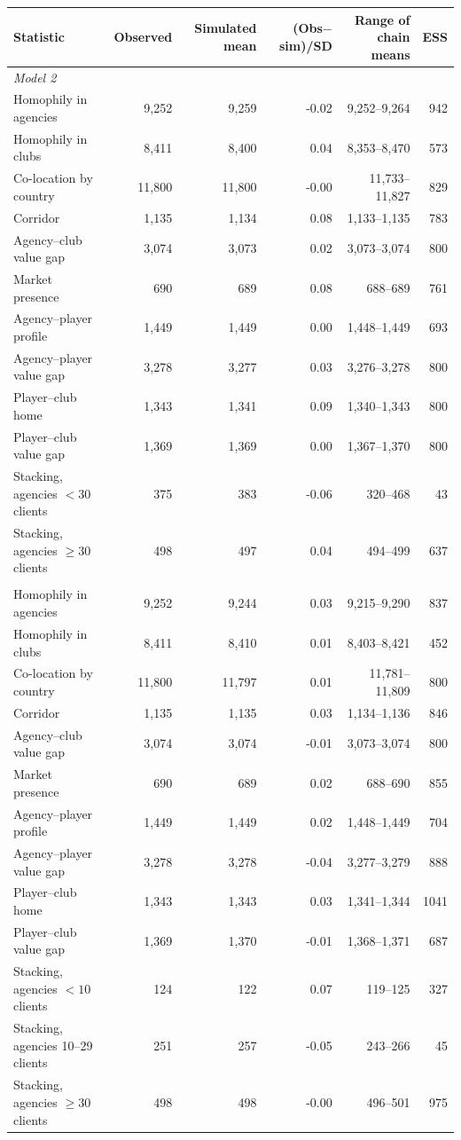 \begin{tabular}{l rrrr r}\toprule
Statistic & Observed & Simulated mean & (Obs$-$sim)/SD & Range of chain means & ESS\\\midrule
\multicolumn{6}{l}{\emph{Model 2}}\\
Homophily in agencies & 9,252 & 9,259 & -0.02 & 9,252--9,264 & 942\\
Homophily in clubs & 8,411 & 8,400 & 0.04 & 8,353--8,470 & 573\\
Co-location by country & 11,800 & 11,800 & -0.00 & 11,733--11,827 & 829\\
Corridor & 1,135 & 1,134 & 0.08 & 1,133--1,135 & 783\\
Agency--club value gap & 3,074 & 3,073 & 0.02 & 3,073--3,074 & 800\\
Market presence & 690 & 689 & 0.08 & 688--689 & 761\\
Agency--player profile & 1,449 & 1,449 & 0.00 & 1,448--1,449 & 693\\
Agency--player value gap & 3,278 & 3,277 & 0.03 & 3,276--3,278 & 800\\
Player--club home & 1,343 & 1,341 & 0.09 & 1,340--1,343 & 800\\
Player--club value gap & 1,369 & 1,369 & 0.00 & 1,367--1,370 & 800\\
Stacking, agencies $<30$ clients & 375 & 383 & -0.06 & 320--468 & 43\\
Stacking, agencies $\ge30$ clients & 498 & 497 & 0.04 & 494--499 & 637\\
\addlinespace
\multicolumn{6}{l}{\emph{Model 3}}\\
Homophily in agencies & 9,252 & 9,244 & 0.03 & 9,215--9,290 & 837\\
Homophily in clubs & 8,411 & 8,410 & 0.01 & 8,403--8,421 & 452\\
Co-location by country & 11,800 & 11,797 & 0.01 & 11,781--11,809 & 800\\
Corridor & 1,135 & 1,135 & 0.03 & 1,134--1,136 & 846\\
Agency--club value gap & 3,074 & 3,074 & -0.01 & 3,073--3,074 & 800\\
Market presence & 690 & 689 & 0.02 & 688--690 & 855\\
Agency--player profile & 1,449 & 1,449 & 0.02 & 1,448--1,449 & 704\\
Agency--player value gap & 3,278 & 3,278 & -0.04 & 3,277--3,279 & 888\\
Player--club home & 1,343 & 1,343 & 0.03 & 1,341--1,344 & 1041\\
Player--club value gap & 1,369 & 1,370 & -0.01 & 1,368--1,371 & 687\\
Stacking, agencies $<10$ clients & 124 & 122 & 0.07 & 119--125 & 327\\
Stacking, agencies 10--29 clients & 251 & 257 & -0.05 & 243--266 & 45\\
Stacking, agencies $\ge30$ clients & 498 & 498 & -0.00 & 496--501 & 975\\
\bottomrule
\end{tabular}
